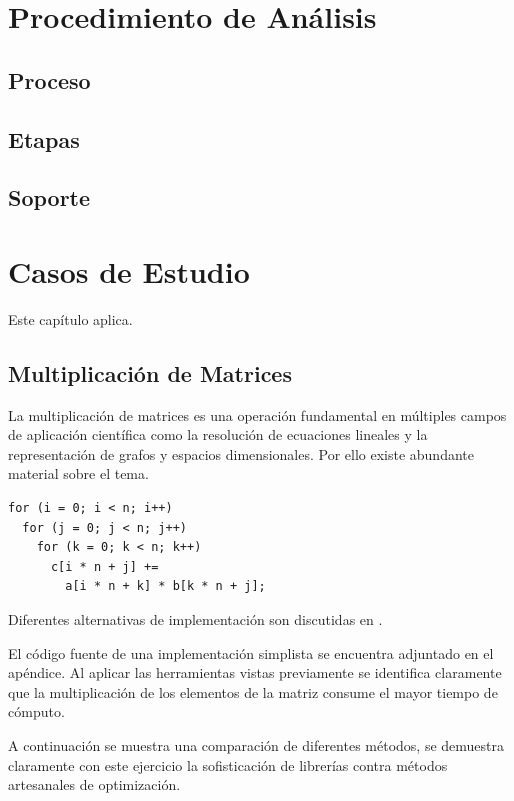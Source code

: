\documentclass[a4paper]{report}
\begin{document}
\chapter{Procedimiento de An\'alisis}

\section{Proceso}

\section{Etapas}

\section{Soporte}

\chapter{Casos de Estudio}

Este cap\'itulo aplica.

\section{Multiplicaci\'on de Matrices}

La multiplicaci\'on de matrices es una operaci\'on fundamental en m\'ultiples
campos de aplicaci\'on cient\'ifica como la resoluci\'on de ecuaciones
lineales y la representaci\'on de grafos y espacios dimensionales. Por ello
existe abundante material sobre el tema.

\begin{verbatim}
for (i = 0; i < n; i++)
  for (j = 0; j < n; j++)
    for (k = 0; k < n; k++)
      c[i * n + j] += 
        a[i * n + k] * b[k * n + j];
\end{verbatim}

Diferentes alternativas de implementaci\'on son discutidas en
\cite{mm-matrixmultiplicationtool}.

\bigskip

El c\'odigo fuente de una implementaci\'on simplista se encuentra adjuntado en
el ap\'endice. Al aplicar las herramientas vistas previamente se identifica
claramente que la multiplicaci\'on de los elementos de la matriz consume el
mayor tiempo de c\'omputo.

\bigskip

A continuaci\'on se muestra una comparaci\'on de diferentes m\'etodos, se
demuestra claramente con este ejercicio la sofisticaci\'on de librer\'ias
contra m\'etodos artesanales de optimizaci\'on.
\end{document}
